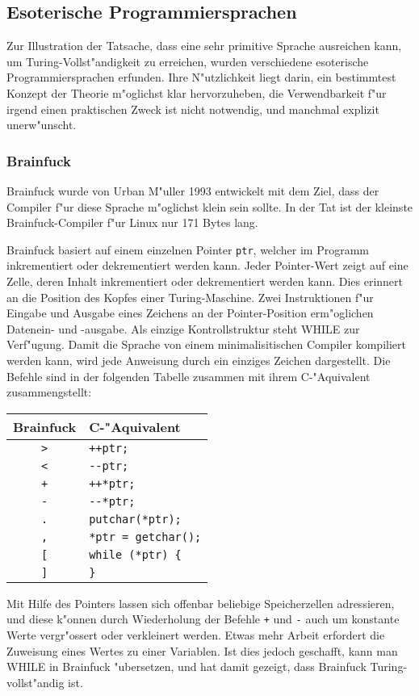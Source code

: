 \subsection{Esoterische Programmiersprachen}
Zur Illustration der Tatsache, dass eine sehr primitive Sprache
ausreichen kann, um Turing-Vollst"andigkeit zu erreichen, wurden
verschiedene esoterische Programmiersprachen erfunden.
Ihre N"utzlichkeit liegt darin, ein bestimmtest Konzept der Theorie
m"oglichst klar hervorzuheben, die Verwendbarkeit f"ur irgend einen
praktischen Zweck ist nicht notwendig, und manchmal explizit unerw"unscht.

\subsubsection{Brainfuck}
Brainfuck
wurde von Urban M"uller 1993 entwickelt mit dem Ziel, dass der
Compiler f"ur diese Sprache m"oglichst klein sein sollte. In der
Tat ist der kleinste Brainfuck-Compiler f"ur Linux nur 171 Bytes
lang.

Brainfuck basiert auf einem einzelnen Pointer {\tt ptr}, welcher
im Programm inkrementiert oder dekrementiert werden kann.
Jeder Pointer-Wert zeigt auf eine Zelle, deren Inhalt inkrementiert
oder dekrementiert werden kann.
Dies erinnert an die Position des Kopfes einer Turing-Maschine.
Zwei Instruktionen f"ur Eingabe und Ausgabe eines Zeichens
an der Pointer-Position erm"oglichen Datenein- und -ausgabe.
Als einzige Kontrollstruktur steht WHILE zur Verf"ugung. Damit
die Sprache von einem minimalisitischen Compiler kompiliert
werden kann, wird jede Anweisung durch ein einziges Zeichen
dargestellt. Die Befehle sind in der folgenden Tabelle
zusammen mit ihrem C-"Aquivalent zusammengstellt:
\begin{center}
\begin{tabular}{|c|l|}
\hline
Brainfuck&C-"Aquivalent\\
\hline
{\tt >}&\verb/++ptr;/\\
{\tt <}&\verb/--ptr;/\\
{\tt +}&\verb/++*ptr;/\\
{\tt -}&\verb/--*ptr;/\\
{\tt .}&\verb/putchar(*ptr);/\\
{\tt ,}&\verb/*ptr = getchar();/\\
{\tt [}&\verb/while (*ptr) {/\\
{\tt ]}&\verb/}/\\
\hline
\end{tabular}
\end{center}
Mit Hilfe des Pointers lassen sich offenbar beliebige Speicherzellen
adressieren, und diese k"onnen durch Wiederholung der Befehle {\tt +}
und {\tt -} auch um konstante Werte vergr"ossert
oder verkleinert werden. Etwas mehr Arbeit erfordert die Zuweisung
eines Wertes zu einer Variablen. Ist dies jedoch geschafft, kann
man WHILE in Brainfuck "ubersetzen, und hat damit gezeigt, dass
Brainfuck Turing-vollst"andig ist.

